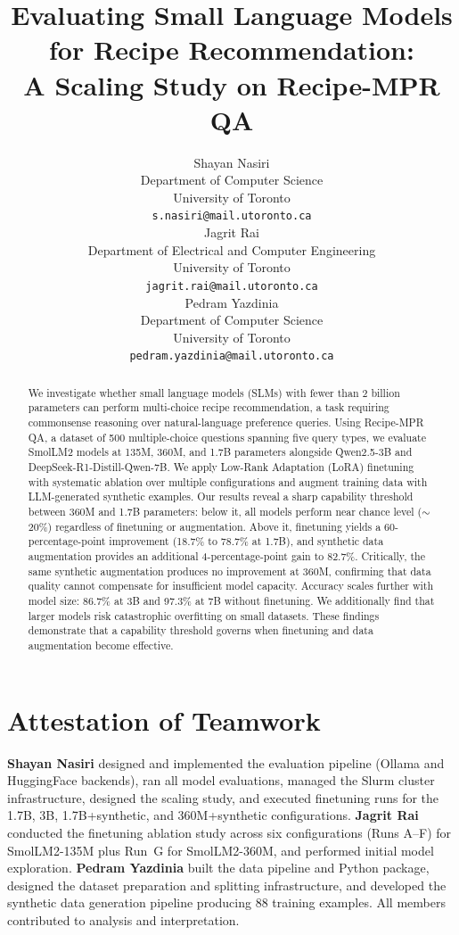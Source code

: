 \documentclass{article}
\title{Evaluating Small Language Models for Recipe Recommendation:\\A Scaling Study on Recipe-MPR QA}
\author{%
  Shayan Nasiri\\
  Department of Computer Science\\
  University of Toronto\\
  \texttt{s.nasiri@mail.utoronto.ca} \\
  \And
  Jagrit Rai\\
  Department of Electrical and Computer Engineering\\
  University of Toronto\\
  \texttt{jagrit.rai@mail.utoronto.ca} \\
  \And
  Pedram Yazdinia\\
  Department of Computer Science\\
  University of Toronto\\
  \texttt{pedram.yazdinia@mail.utoronto.ca} \\
}
\begin{document}
\maketitle

\begin{abstract}
We investigate whether small language models (SLMs) with fewer than 2 billion parameters can perform multi-choice recipe recommendation, a task requiring commonsense reasoning over natural-language preference queries. Using Recipe-MPR QA, a dataset of 500 multiple-choice questions spanning five query types, we evaluate SmolLM2 models at 135M, 360M, and 1.7B parameters alongside Qwen2.5-3B and DeepSeek-R1-Distill-Qwen-7B. We apply Low-Rank Adaptation (LoRA) finetuning with systematic ablation over multiple configurations and augment training data with LLM-generated synthetic examples. Our results reveal a sharp capability threshold between 360M and 1.7B parameters: below it, all models perform near chance level ($\sim$20\%) regardless of finetuning or augmentation. Above it, finetuning yields a 60-percentage-point improvement (18.7\% to 78.7\% at 1.7B), and synthetic data augmentation provides an additional 4-percentage-point gain to 82.7\%. Critically, the same synthetic augmentation produces no improvement at 360M, confirming that data quality cannot compensate for insufficient model capacity. Accuracy scales further with model size: 86.7\% at 3B and 97.3\% at 7B without finetuning. We additionally find that larger models risk catastrophic overfitting on small datasets. These findings demonstrate that a capability threshold governs when finetuning and data augmentation become effective.
\end{abstract}

\section*{Attestation of Teamwork}

\textbf{Shayan Nasiri} designed and implemented the evaluation pipeline (Ollama and HuggingFace backends), ran all model evaluations, managed the Slurm cluster infrastructure, designed the scaling study, and executed finetuning runs for the 1.7B, 3B, 1.7B+synthetic, and 360M+synthetic configurations. \textbf{Jagrit Rai} conducted the finetuning ablation study across six configurations (Runs A--F) for SmolLM2-135M plus Run~G for SmolLM2-360M, and performed initial model exploration. \textbf{Pedram Yazdinia} built the data pipeline and Python package, designed the dataset preparation and splitting infrastructure, and developed the synthetic data generation pipeline producing 88 training examples. All members contributed to analysis and interpretation.
\end{document}
